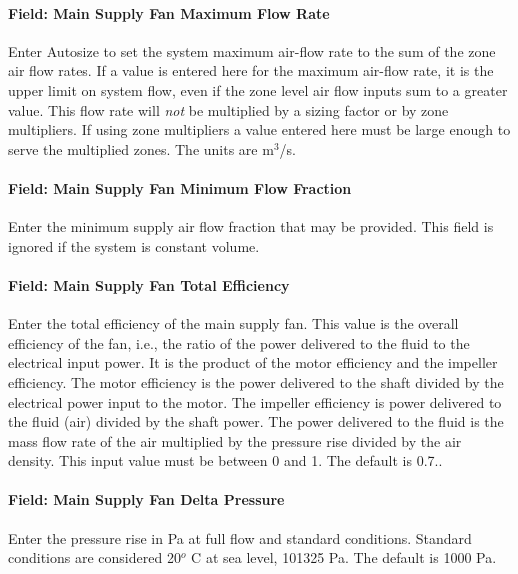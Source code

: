 \paragraph{Field: Main Supply Fan Maximum Flow Rate}\label{field-main-supply-fan-maximum-flow-rate}

Enter Autosize to set the system maximum air-flow rate to the sum of the zone air flow rates. If a value is entered here for the maximum air-flow rate, it is the upper limit on system flow, even if the zone level air flow inputs sum to a greater value. This flow rate will \emph{not} be multiplied by a sizing factor or by zone multipliers. If using zone multipliers a value entered here must be large enough to serve the multiplied zones. The units are m\(^{3}\)/s.

\paragraph{Field: Main Supply Fan Minimum Flow Fraction}\label{field-main-supply-fan-minimum-flow-fraction}

Enter the minimum supply air flow fraction that may be provided. This field is ignored if the system is constant volume.

\paragraph{Field: Main Supply Fan Total Efficiency}\label{field-main-supply-fan-total-efficiency}

Enter the total efficiency of the main supply fan. This value is the overall efficiency of the fan, i.e., the ratio of the power delivered to the fluid to the electrical input power. It is the product of the motor efficiency and the impeller efficiency. The motor efficiency is the power delivered to the shaft divided by the electrical power input to the motor. The impeller efficiency is power delivered to the fluid (air) divided by the shaft power. The power delivered to the fluid is the mass flow rate of the air multiplied by the pressure rise divided by the air density. This input value must be between 0 and 1. The default is 0.7..

\paragraph{Field: Main Supply Fan Delta Pressure}\label{field-main-supply-fan-delta-pressure}

Enter the pressure rise in Pa at full flow and standard conditions. Standard conditions are considered 20\(^{o}\) C at sea level, 101325 Pa. The default is 1000 Pa.

